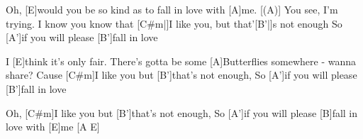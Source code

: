 \begin{guitar}
	Oh, [E]would you be so kind as to fall in love with [A]me.
	[(A)] You see, I'm trying. I know you know that 
	[C#m|]{I }like you, but that'[B'|]{s }not enough
	So [A']if you will please [B']fall in love
	
	I [E]think it's only fair. There's gotta be some 
	[A]Butterflies somewhere - wanna share?
	Cause [C#m]I like you but [B']that's not enough,
	So [A']if you will please [B']fall in love
	
	Oh, [C#m]I like you but [B']that's not enough,
	So [A']if you will please [B]fall in love with [E]me [A E]{}
	
	
\end{guitar}